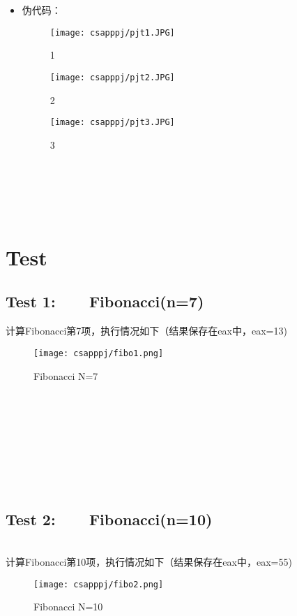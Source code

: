 \documentclass{article}
\begin{document}
\begin{spacing}{1.5}
\begin{itemize}
(4)有些变量在某些周期是没有用的，比如有些指令 JMP不用ALU，要设为空。
\item
伪代码：
\begin{figure}[htbp]
\centering
\texttt{[image: csapppj/pjt1.JPG]}
\caption{1}
\end{figure}
\begin{figure}[htbp]
\centering
\texttt{[image: csapppj/pjt2.JPG]}
\caption{2}
\end{figure}
\begin{figure}[htbp]
\centering
\texttt{[image: csapppj/pjt3.JPG]}
\caption{3}
\end{figure}
\end{itemize}
\\\\\\\\
\section{Test}
\subsection{Test 1:\ \ \ \ Fibonacci(n=7)}
\noindent
{}
\setlength{\hangindent}{3.5em}
计算Fibonacci第7项，执行情况如下（结果保存在eax中，eax=13)
\begin{figure}[htbp]
\centering
\texttt{[image: csapppj/fibo1.png]}
\caption{Fibonacci N=7}
\end{figure}
\\\\\\\\\\\\\\
\subsection{Test 2:\ \ \ \ Fibonacci(n=10)}
\noindent
{}
\setlength{\hangindent}{3.3em}\\
计算Fibonacci第10项，执行情况如下（结果保存在eax中，eax=55)
\begin{figure}[htbp]
\centering
\texttt{[image: csapppj/fibo2.png]}
\caption{Fibonacci N=10}
\end{figure}
\\\\\\\\\\\\\\

\end{spacing}
\end{document}

